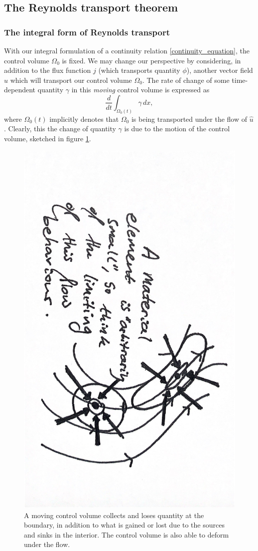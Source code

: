 \subsection{The Reynolds transport theorem}
\subsubsection{The integral form of Reynolds transport}
With our integral formulation of a continuity relation \eqref{continuity_equation}, the control volume $\Omega_0$ is fixed.
We may change our perspective by considering, in addition to the flux function $j$ (which transports quantity $\phi$), another
vector field $\hat{u}$ which will transport our control volume $\Omega_0$. The rate of change of some time-dependent quantity $\gamma$ in this
\textit{moving} control volume is expressed as
\begin{equation}\label{reynolds_rate_of_change}
    \frac{d}{dt}\int_{\Omega_0(t)}\gamma\,dx,
\end{equation}
where $\Omega_0(t)$ implicitly denotes that $\Omega_0$ is being transported under the flow of $\hat{u}$.
Clearly, this the change of quantity $\gamma$ is due to the motion of the control volume, sketched in figure \ref{sketch_reynolds}.
\begin{figure}[H]
\centerline{\includegraphics[angle=90,page=7,width=0.66\linewidth]{figures/2.pdf}}
\caption{\small
    A moving control volume collects and loses quantity at the boundary, in addition to what is gained or lost due to the sources
    and sinks in the interior. The control volume is also able to deform under the flow.
}
\label{sketch_reynolds}
\end{figure}
